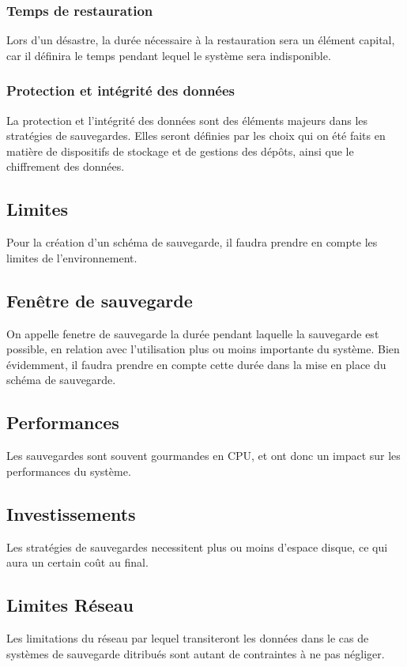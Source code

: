 \documentclass[a4paper,11pt]{report}
\begin{document}
\subsubsection{Temps de restauration}
Lors d'un désastre, la durée nécessaire à la restauration sera un élément capital, car il définira le temps pendant lequel le système sera indisponible.

\subsubsection{Protection et intégrité des données}
La protection et l'intégrité des données sont des éléments majeurs dans les stratégies de sauvegardes.
Elles seront définies par les choix qui on été faits en matière de dispositifs de stockage et de gestions des dépôts, ainsi que le chiffrement des données.

\subsection{Limites}
Pour la création d'un schéma de sauvegarde, il faudra prendre en compte les limites de l'environnement.

\subsection{Fenêtre de sauvegarde}
On appelle fenetre de sauvegarde la durée pendant laquelle la sauvegarde est possible, en relation avec l'utilisation plus ou moins importante du système.
Bien évidemment, il faudra prendre en compte cette durée dans la mise en place du schéma de sauvegarde.

\subsection{Performances}
Les sauvegardes sont souvent gourmandes en CPU, et ont donc un impact sur les performances du système.

\subsection{Investissements}
Les stratégies de sauvegardes necessitent plus ou moins d'espace disque, ce qui aura un certain coût au final.

\subsection{Limites Réseau}
Les limitations du réseau par lequel transiteront les données dans le cas de systèmes de sauvegarde ditribués sont autant de contraintes à ne pas négliger.
\end{document}
